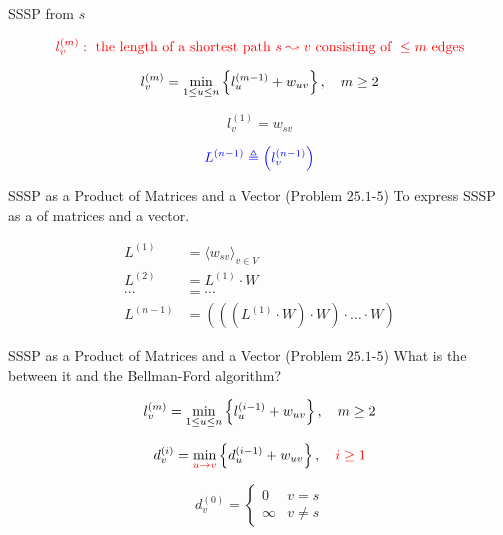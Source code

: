 \begin{frame}{}
  \begin{center}
    SSSP from $s$
  \end{center}
  \pause
  \[
    \textcolor{red}{l_{v}^{(m)}: \text{ the length of a shortest path } s \leadsto v \text{ consisting of } \le m \text{ edges}}
  \]

  \pause
  \[
    l_{v}^{(m)} = \min_{1 \le u \le n} \left\{l_{u}^{(m-1)} + w_{uv}\right\}, \quad m \ge 2
  \]

  \pause
  \[
    l_{v}^{(1)} = w_{sv}
  \]

  \pause
  \[
    \textcolor{blue}{L^{(n-1)} \triangleq \left(l_{v}^{(n-1)}\right)}
  \]
\end{frame}

\begin{frame}{}
  \begin{exampleblock}{SSSP as a Product of Matrices and a Vector (Problem $25.1$-$5$)}
    To express SSSP as a  of matrices and a vector.
  \end{exampleblock}

  \pause
  \begin{align*}
    L^{(1)} &= \langle w_{sv} \rangle_{v \in V} \\
    L^{(2)} &= L^{(1)} \cdot W \\
    \cdots &= \cdots \\
    L^{(n-1)} &= \left(\left(\left(L^{(1)} \cdot W \right) \cdot W \right) \cdot \ldots \cdot W\right)
  \end{align*}
\end{frame}

\begin{frame}{}
  \begin{exampleblock}{SSSP as a Product of Matrices and a Vector (Problem $25.1$-$5$)}
    What is the  between it and the Bellman-Ford algorithm?
  \end{exampleblock}

  \pause
  \[
    l_{v}^{(m)} = \min_{1 \le u \le n} \left\{l_{u}^{(i-1)} + w_{uv}\right\}, \quad m \ge 2
  \]

  \pause
  \[
    d_{v}^{(i)} = \min_{\textcolor{red}{u \to v}} \left\{d_{u}^{(i-1)} + w_{uv}\right\}, \quad \textcolor{red}{i \ge 1}
  \]

  \pause
  \[
    d_{v}^{(0)} = \begin{cases}
      0 & v = s \\
      \infty & v \neq s
    \end{cases}
  \]
\end{frame}

